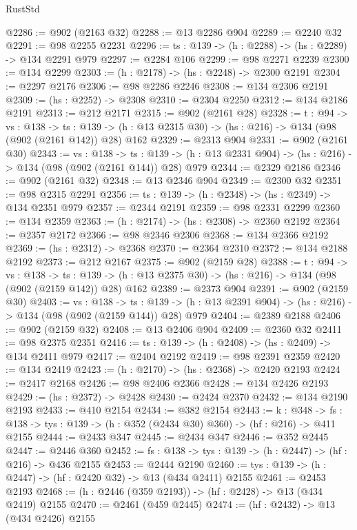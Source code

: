 \begin{lexlean}{RustStd}
\begin{coremodule}
{\begin{coremodule}
{{{{{{{{{@2286 := @902 (@2163 @32)
@2288 := @13 @2286 @904
@2289 := @2240 @32
@2291 := @98 @2255 @2231
@2296 := {ts : @139} -> (h : @2288) -> (hs : @2289) -> @134 @2291 @979
@2297 := @2284 @106
@2299 := @98 @2271 @2239
@2300 := @134 @2299
@2303 := (h : @2178) -> (hs : @2248) -> @2300 @2191
@2304 := @2297 @2176
@2306 := @98 @2286 @2246
@2308 := @134 @2306 @2191
@2309 := (hs : @2252) -> @2308
@2310 := @2304 @2250
@2312 := @134 @2186 @2191
@2313 := @212 @2171
@2315 := @902 (@2161 @28)
@2328 := {t : @94} ->
  {vs : @138} ->
  {ts : @139} -> (h : @13 @2315 @30) -> (hs : @216) -> @134 (@98 (@902 (@2161 @142)) @28) @162
@2329 := @2313 @904
@2331 := @902 (@2161 @30)
@2343 := {vs : @138} ->
  {ts : @139} -> (h : @13 @2331 @904) -> (hs : @216) -> @134 (@98 (@902 (@2161 @144)) @28) @979
@2344 := @2329 @2186
@2346 := @902 (@2161 @32)
@2348 := @13 @2346 @904
@2349 := @2300 @32
@2351 := @98 @2315 @2291
@2356 := {ts : @139} -> (h : @2348) -> (hs : @2349) -> @134 @2351 @979
@2357 := @2344 @2191
@2359 := @98 @2331 @2299
@2360 := @134 @2359
@2363 := (h : @2174) -> (hs : @2308) -> @2360 @2192
@2364 := @2357 @2172
@2366 := @98 @2346 @2306
@2368 := @134 @2366 @2192
@2369 := (hs : @2312) -> @2368
@2370 := @2364 @2310
@2372 := @134 @2188 @2192
@2373 := @212 @2167
@2375 := @902 (@2159 @28)
@2388 := {t : @94} ->
  {vs : @138} ->
  {ts : @139} -> (h : @13 @2375 @30) -> (hs : @216) -> @134 (@98 (@902 (@2159 @142)) @28) @162
@2389 := @2373 @904
@2391 := @902 (@2159 @30)
@2403 := {vs : @138} ->
  {ts : @139} -> (h : @13 @2391 @904) -> (hs : @216) -> @134 (@98 (@902 (@2159 @144)) @28) @979
@2404 := @2389 @2188
@2406 := @902 (@2159 @32)
@2408 := @13 @2406 @904
@2409 := @2360 @32
@2411 := @98 @2375 @2351
@2416 := {ts : @139} -> (h : @2408) -> (hs : @2409) -> @134 @2411 @979
@2417 := @2404 @2192
@2419 := @98 @2391 @2359
@2420 := @134 @2419
@2423 := (h : @2170) -> (hs : @2368) -> @2420 @2193
@2424 := @2417 @2168
@2426 := @98 @2406 @2366
@2428 := @134 @2426 @2193
@2429 := (hs : @2372) -> @2428
@2430 := @2424 @2370
@2432 := @134 @2190 @2193
@2433 := @410 @2154
@2434 := @382 @2154
@2443 := {k : @348} ->
  {fs : @138} -> {tys : @139} -> (h : @352 (@2434 @30) @360) -> (hf : @216) -> @411 @2155
@2444 := @2433 @347
@2445 := @2434 @347
@2446 := @352 @2445
@2447 := @2446 @360
@2452 := {fs : @138} -> {tys : @139} -> (h : @2447) -> (hf : @216) -> @436 @2155
@2453 := @2444 @2190
@2460 := {tys : @139} -> (h : @2447) -> (hf : @2420 @32) -> @13 (@434 @2411) @2155
@2461 := @2453 @2193
@2468 := (h : @2446 (@359 @2193)) -> (hf : @2428) -> @13 (@434 @2419) @2155
@2470 := @2461 (@459 @2445)
@2474 := (hf : @2432) -> @13 (@434 @2426) @2155
}}}}}}}}}
\end{coremodule}}
\end{coremodule}
\end{lexlean}
